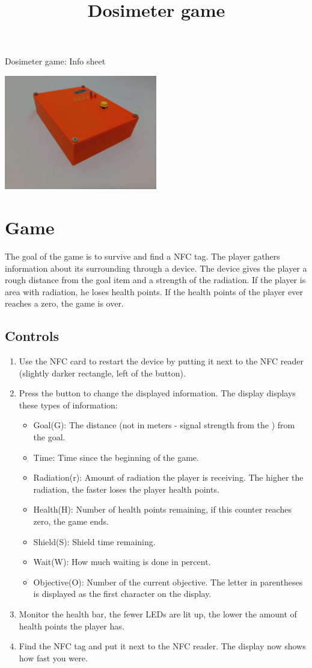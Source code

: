 \documentclass{article}
\title{Dosimeter game}
\begin{document}
{\huge{Dosimeter game: Info sheet}}

\begin{center}
    \centering
    \includegraphics[width=0.5\textwidth]{imgs/Box2.jpg}
\end{center}

\section{Game}
The goal of the game is to survive and find a NFC tag. 
The player gathers information about its surrounding through a device.
The device gives the player a rough distance from the goal item and a strength of the radiation.
If the player is area with radiation, he loses health points.
If the health points of the player ever reaches a zero, the game is over.

\subsection{Controls}
\begin{enumerate}
\item Use the NFC card to restart the device by putting it next to the NFC reader (slightly darker rectangle, left of the button).
\item Press the button to change the displayed information. The display displays these types of information:
\begin{itemize}
\item Goal(G): The distance (not in meters - signal strength from the ) from the goal.
\item Time: Time since the beginning of the game.
\item Radiation(r): Amount of radiation the player is receiving. The higher the radiation, the faster loses the player health points. 
\item Health(H): Number of health points remaining, if this counter reaches zero, the game ends.
\item Shield(S): Shield time remaining.
\item Wait(W): How much waiting is done in percent.
\item Objective(O): Number of the current objective.
The letter in parentheses is displayed as the first character on the display.
\end{itemize}
\item Monitor the health bar, the fewer LEDs are lit up, the lower the amount of health points the player has.
\item Find the NFC tag and put it next to the NFC reader. The display now shows how fast you were.
\end{enumerate}
\end{document}

